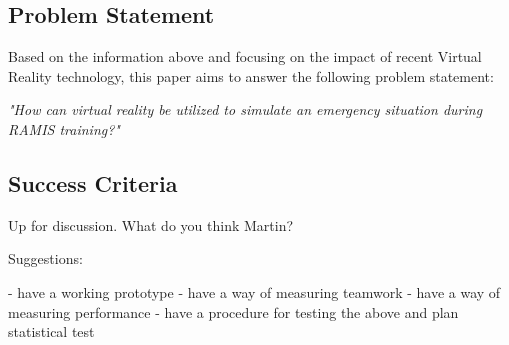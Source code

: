 \documentclass[paper=a4, fontsize=11pt]{scrartcl} %
\numberwithin{equation}{section} %
\numberwithin{figure}{section} %
\numberwithin{table}{section} %
\begin{document}
\subsection{Problem Statement}

Based on the information above and focusing on the impact of recent Virtual Reality technology, this paper aims to answer the following problem statement:\\

\begin{center}
\emph{\textit{"How can virtual reality be utilized to simulate an emergency situation during RAMIS training?"}}
\end{center}


\subsection{Success Criteria}

Up for discussion. What do you think Martin? 

Suggestions: 

- have a working prototype
- have a way of measuring teamwork
- have a way of measuring performance
- have a procedure for testing the above and plan statistical test

\end{document}
